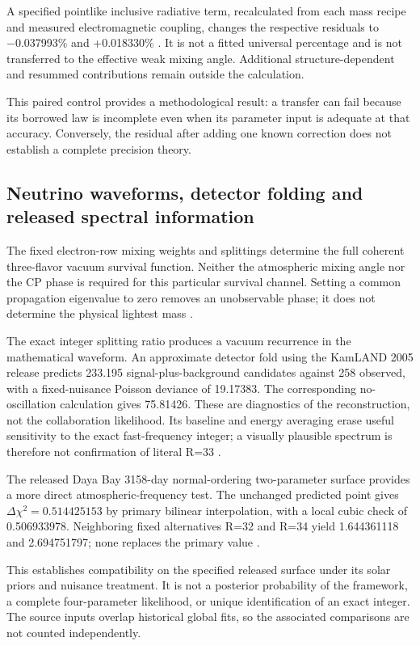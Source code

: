 \documentclass[11pt,a4paper]{article}
\begin{document}
A specified pointlike inclusive radiative term, recalculated from each mass recipe and measured electromagnetic coupling, changes the respective residuals to −0.037993\% and +0.018330\% \cite{R19}. It is not a fitted universal percentage and is not transferred to the effective weak mixing angle. Additional structure-dependent and resummed contributions remain outside the calculation.

This paired control provides a methodological result: a transfer can fail because its borrowed law is incomplete even when its parameter input is adequate at that accuracy. Conversely, the residual after adding one known correction does not establish a complete precision theory.

\subsection{Neutrino waveforms, detector folding and released spectral information}\label{neutrino-waveforms-detector-folding-and-released-spectral-information}

The fixed electron-row mixing weights and splittings determine the full coherent three-flavor vacuum survival function. Neither the atmospheric mixing angle nor the CP phase is required for this particular survival channel. Setting a common propagation eigenvalue to zero removes an unobservable phase; it does not determine the physical lightest mass \cite{R20}.

The exact integer splitting ratio produces a vacuum recurrence in the mathematical waveform. An approximate detector fold using the KamLAND 2005 release predicts 233.195 signal-plus-background candidates against 258 observed, with a fixed-nuisance Poisson deviance of 19.17383. The corresponding no-oscillation calculation gives 75.81426. These are diagnostics of the reconstruction, not the collaboration likelihood. Its baseline and energy averaging erase useful sensitivity to the exact fast-frequency integer; a visually plausible spectrum is therefore not confirmation of literal R=33 \cite{R21}.

The released Daya Bay 3158-day normal-ordering two-parameter surface provides a more direct atmospheric-frequency test. The unchanged predicted point gives \(\Delta\chi^2=0.514425153\) by primary bilinear interpolation, with a local cubic check of 0.506933978. Neighboring fixed alternatives R=32 and R=34 yield 1.644361118 and 2.694751797; none replaces the primary value \cite{R22}.

This establishes compatibility on the specified released surface under its solar priors and nuisance treatment. It is not a posterior probability of the framework, a complete four-parameter likelihood, or unique identification of an exact integer. The source inputs overlap historical global fits, so the associated comparisons are not counted independently.
\end{document}
